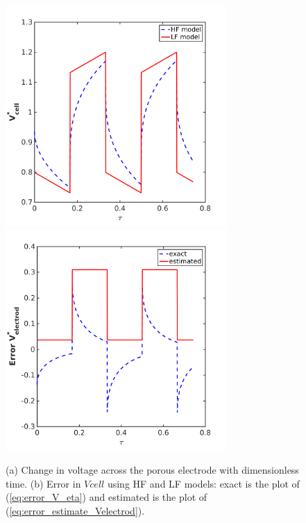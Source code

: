 \documentclass[]{article}
\begin{document}
\begin{figure}[t]
    \centering
    \includegraphics[trim = 0in 0in 0in 0in, clip, width=0.75\textwidth]{figures/cyclic_new/Vcell_t.png}      
    ~
    \includegraphics[trim = 0in 0in 0in 0in, clip, width=0.75\textwidth]{figures/cyclic_new/Error_V.png}      
    \caption{(a) Change in voltage across the porous electrode with dimensionless time.
    (b) Error in $Vcell$ using HF and LF models: exact is the plot of (\ref{eq:error_V_eta}) and estimated is the plot of (\ref{eq:error_estimate_Velectrod}).}
    \label{fig:Vcell}
\end{figure}
\end{document}
